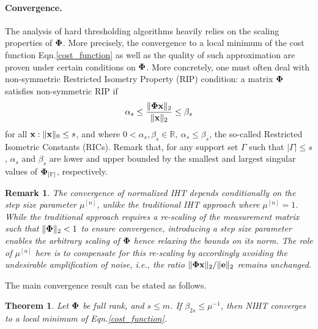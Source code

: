 \documentclass{article}
\newtheorem{theorem}{Theorem}
\newtheorem{remark}{Remark}
\begin{document}

\paragraph{Convergence.} 
The analysis of hard thresholding algorithms heavily relies on the scaling properties of ${\bf \Phi}$. More precisely, the convergence to a local minimum of the cost function Eqn.\ref{cost_function} as well as the quality of such approximation are proven under certain conditions on ${\bf \Phi}$. More concretely, one must often deal with non-symmetric Restricted Isometry Property (RIP) condition: a matrix ${\bf \Phi}$ satisfies non-symmetric RIP if
\begin{equation}\label{rip}
\alpha_{s} \leq \frac{\|{\bf \Phi} {\bf x}\|_2}{\|{\bf x}\|_2} \leq \beta_{s}
\end{equation}
\vspace{0.5em}
for all ${\bf x}: \|{\bf x}\|_0 \leq s$, and where $0<\alpha_s, \beta_s \in \mathbb{R}, \ \alpha_s\leq \beta_s$, the so-called Restricted Isometric Constants (RICs). Remark that, for any support set $\Gamma$ such that $|\Gamma| \leq s$, $\alpha_s$ and $\beta_s$ are lower and upper bounded by the smallest and largest singular values of ${\bf \Phi}_{|\Gamma|}$, respectively.

\begin{remark}\label{remark_noise_amp}
The convergence of normalized IHT depends conditionally on the step size parameter $\mu^{[n]}$, unlike the traditional IHT approach where $\mu^{[n]}=1$.
While the traditional approach requires a re-scaling of the measurement matrix such that $\|{\bf \Phi}\|_2 <1$ to ensure convergence, introducing a step size parameter enables the arbitrary scaling of ${\bf \Phi}$ hence relaxing the bounds on its norm. The role of $\mu^{[n]}$ here is to compensate for this re-scaling by accordingly avoiding the undesirable amplification of noise, i.e., the ratio $\|{\bf \Phi x}\|_2/\|{\bf e}\|_2$ remains unchanged. 
\end{remark}
\vspace{-0.8em}
The main convergence result can be stated as follows.
\begin{theorem}\label{theorem_convergence_IHT}
{\rm{\cite{blumensath2012greedy}}}
Let ${\bf \Phi}$ be full rank, and $s\leq m$. If $\beta_{2s}\leq\mu^{-1}$, then NIHT converges to a local minimum of Eqn.\ref{cost_function}.
\end{theorem}
\end{document}
